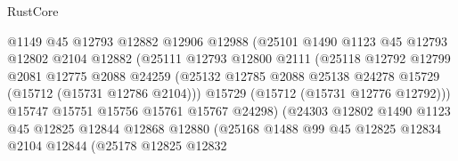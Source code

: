 \begin{lexlean}{RustCore}
\begin{coremodule}
                                @1149
                                @45
                                @12793
                                @12882
                                @12906
                                @12988
                                (@25101
                                  @1490
                                  @1123
                                  @45
                                  @12793
                                  @12802
                                  @2104
                                  @12882
                                  (@25111
                                    @12793
                                    @12800
                                    @2111
                                    (@25118
                                      @12792
                                      @12799
                                      @2081
                                      @12775
                                      @2088
                                      @24259
                                      (@25132
                                        @12785
                                        @2088
                                        @25138
                                        @24278
                                        @15729
                                        (@15712 (@15731 @12786 @2104)))
                                      @15729
                                      (@15712 (@15731 @12776 @12792)))
                                    @15747
                                    @15751
                                    @15756
                                    @15761
                                    @15767
                                    @24298)
                                  (@24303
                                    @12802
                                    @1490
                                    @1123
                                    @45
                                    @12825
                                    @12844
                                    @12868
                                    @12880
                                    (@25168
                                      @1488
                                      @99
                                      @45
                                      @12825
                                      @12834
                                      @2104
                                      @12844
                                      (@25178
                                        @12825
                                        @12832

\end{coremodule}
\end{lexlean}
